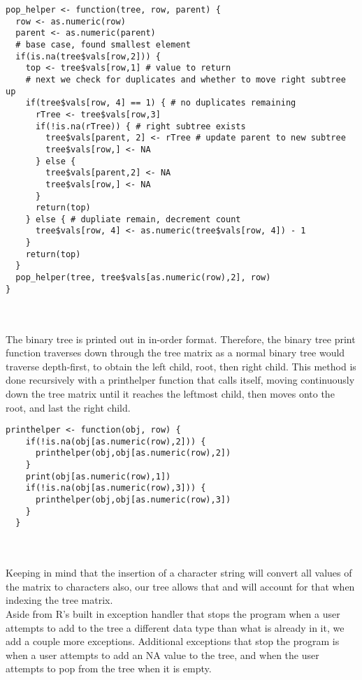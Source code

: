 \documentclass{article}
\begin{document}
\begin{lstlisting}
pop_helper <- function(tree, row, parent) {
  row <- as.numeric(row)
  parent <- as.numeric(parent)
  # base case, found smallest element
  if(is.na(tree$vals[row,2])) { 
    top <- tree$vals[row,1] # value to return
    # next we check for duplicates and whether to move right subtree up
    if(tree$vals[row, 4] == 1) { # no duplicates remaining
      rTree <- tree$vals[row,3]
      if(!is.na(rTree)) { # right subtree exists
        tree$vals[parent, 2] <- rTree # update parent to new subtree
        tree$vals[row,] <- NA
      } else {
        tree$vals[parent,2] <- NA
        tree$vals[row,] <- NA
      }
      return(top)
    } else { # dupliate remain, decrement count
      tree$vals[row, 4] <- as.numeric(tree$vals[row, 4]) - 1
    }
    return(top)
  }
  pop_helper(tree, tree$vals[as.numeric(row),2], row)
}

\end{lstlisting}
\\\\ The binary tree is printed out in in-order format. Therefore, the binary tree print function traverses down through the tree matrix as a normal binary tree would traverse depth-first, to obtain the left child, root, then right child. This method is done recursively with a printhelper function that calls itself, moving continuously down the tree matrix until it reaches the leftmost child, then moves onto the root, and last the right child.
\begin{lstlisting}
printhelper <- function(obj, row) {
    if(!is.na(obj[as.numeric(row),2])) {
      printhelper(obj,obj[as.numeric(row),2])
    }
    print(obj[as.numeric(row),1])
    if(!is.na(obj[as.numeric(row),3])) {
      printhelper(obj,obj[as.numeric(row),3])
    }
  }
\end{lstlisting}
\\\\ Keeping in mind that the insertion of a character string will convert all values of the matrix to characters also, our tree allows that and will account for that when indexing the tree matrix.
\\Aside from R's built in exception handler that stops the program when a  user attempts to add to the tree a different data type than what is already in it, we add a couple more exceptions. Additional exceptions that stop the program is when a user attempts to add an NA value to the tree, and when the user attempts to pop from the tree when it is empty.
\end{document}
